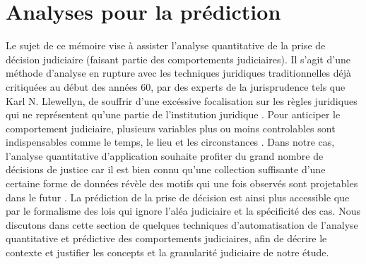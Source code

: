 \section{Analyses pour la prédiction}
\label{sec:literature:legalpredict}
Le sujet de ce mémoire vise à assister l'analyse quantitative de la prise de décision judiciaire (faisant partie des comportements judiciaires). Il s'agit d'une méthode d'analyse en rupture avec les techniques juridiques traditionnelles déjà critiquées au début des années 60, par des experts de la jurisprudence tels que Karl N. Llewellyn, de souffrir d'une excéssive focalisation sur les règles juridiques qui ne représentent qu'une partie de l'institution juridique \citep{llewellyn1962jurisprudence}. Pour anticiper le comportement judiciaire, plusieurs variables plus ou moins controlables sont indispensables comme le temps, le lieu et les circonstances \citep{ulmer1963quantitative}. Dans notre cas, l'analyse quantitative d'application souhaite profiter du grand nombre de décisions de justice car il est bien connu qu'une collection suffisante d'une certaine forme de données révèle des motifs qui une fois observés sont projetables dans le futur \citep{ulmer1963quantitative}. La prédiction de la prise de décision est ainsi plus accessible que par le formalisme des lois qui ignore l'aléa judiciaire et la spécificité des cas.  Nous discutons dans cette section de quelques techniques d'automatisation de l'analyse quantitative et prédictive des comportements judiciaires, afin de décrire le contexte et justifier les concepts et la granularité judiciaire de notre étude.





